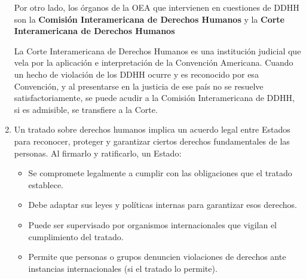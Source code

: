 \documentclass{article}
\begin{document}
\begin{enumerate}
            Por otro lado, los órganos de la OEA que intervienen en cuestiones de DDHH son
            la \textbf{Comisión Interamericana de Derechos Humanos} y la \textbf{Corte
                  Interamericana de Derechos Humanos}

            La Corte Interamericana de Derechos Humanos es una institución judicial que
            vela por la aplicación e interpretación de la Convención Americana. Cuando un
            hecho de violación de los DDHH ocurre y es reconocido por esa Convención, y al
            presentarse en la justicia de ese país no se resuelve satisfactoriamente, se
            puede acudir a la Comisión Interamericana de DDHH, si es admisible, se
            transfiere a la Corte.

      \item Un tratado sobre derechos humanos implica un acuerdo legal entre Estados para
            reconocer, proteger y garantizar ciertos derechos fundamentales de las
            personas. Al firmarlo y ratificarlo, un Estado: 
      
            \begin{itemize}         
                  \item Se compromete legalmente a cumplir con las obligaciones que el tratado establece.
                  
                  \item Debe adaptar sus leyes y políticas internas para garantizar esos derechos.
                  
                  \item Puede ser supervisado por organismos internacionales que vigilan el cumplimiento del tratado.
                  
                  \item Permite que personas o grupos denuncien violaciones de derechos ante instancias internacionales (si el tratado lo permite).
            \end{itemize}
      \end{enumerate}
\end{document}
